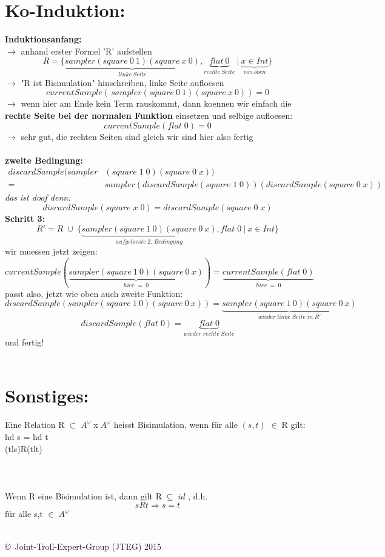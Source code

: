 \documentclass{article}
\begin{document}
	\section{Ko-Induktion:}
	\textbf{Induktionsanfang:}\\
	$\rightarrow$ anhand erster Formel 'R' aufstellen
	\[ 
		R = \{ 
			\underbrace{
				sampler(square\:0\:1)(square\:x\:0)}_{linke\:Seite},\underbrace{flat\:0}_{rechte\:Seite} \:|\: \underbrace{x\in Int}_{von\:oben}\}
		\]
	$\rightarrow$ "R ist Bisimulation" hinschreiben, linke Seite aufloesen\\
	\[ currentSample(\,sampler(square\:0\:1)(square\:x\:0)) = 0 \]
	$\rightarrow$ wenn hier am Ende kein Term rauskommt, dann koennen wir einfach die \textbf{rechte Seite bei der normalen Funktion} einsetzen und selbige aufloesen:
	\[ currentSample(flat\;0) = 0 \]
	$\rightarrow$ sehr gut, die rechten Seiten sind gleich wir sind hier also fertig\\ \\
	\textbf{zweite Bedingung:}
	\begin{align*}	
	discardSample(sampler&(square\;1\;0)(square\;0\;x)) \\
	=& sampler(discardSample (square\;1\;0))(discardSample(square\;0\;x))
	\end{align*}
	\textit{das ist doof denn:}
		\[discardSample(square\;x\;0) = discardSample(square\;0\;x)\]
	\textbf{Schritt 3:}\\
	\[R' = R \;\cup\;\{\underbrace{sampler(square\:1\:0)(square\:0\:x)}_{aufgeloeste\;2.\;Bedingung},flat\;0\:|\:x\in Int\}\]	
	wir muessen jetzt zeigen:
	\[
		currentSample(\underbrace{sampler(square\:1\:0)(square\:0\:x)}_{hier\;=\;0}) = \underbrace{currentSample(flat\;0)}_{hier\;=\;0}
	\]
	passt also, jetzt wie oben auch zweite Funktion:
	\[
		discardSample(sampler(square\:1\:0)(square\:0\:x)) = \underbrace{sampler(square\:1\:0)(square\:0\:x)}_{wieder\;linke\;Seite\;in\;R'}\]\[
		discardSample(flat\;0) = \underbrace{flat\;0}_{wieder\;rechte\;Seite}
	\]
	und fertig!\\\\
\section*{Sonstiges:}
	Eine Relation $\mathrm{R}\;\subset\;A^{\omega}\;$x$\;A^{\omega}$ heisst Bisimulation, wenn f\"ur
	alle $(s,t)$ $\in\; \mathrm{R}$ gilt: \\
	\noindent\hspace{1cm} hd s = hd t\\
	\noindent\hspace{1cm} (tl\;s)\;R\;(tl\;t)\\\\\\\\

	Wenn R eine Bisimulation ist, dann gilt $\mathrm{R}\;\subseteq\;id$ , d.h.
	\[
		sRt \Rightarrow s = t
	\]
	f\"ur alle s,t $\in\;A^\omega$\\\\
	\begin{tiny}
	\copyright\ Joint-Troll-Expert-Group (JTEG) 2015
	\end{tiny}
	\newpage
	
	
	
	
	
	
	
	
	
	
	
	
	
	
	
	
\end{document}
